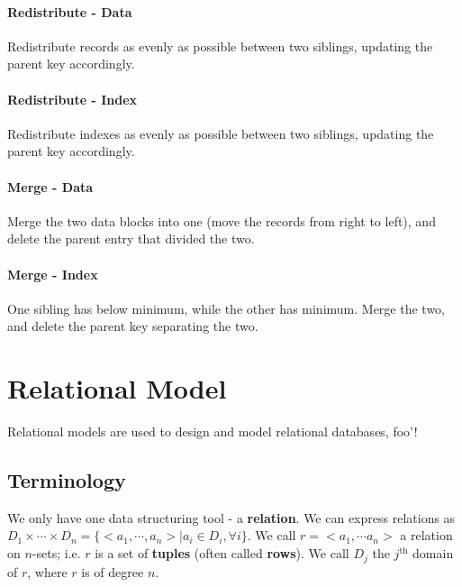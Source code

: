                     \subsubsection{Redistribute - Data} %
                    \label{ssub:redistribute_data}
                        Redistribute records as evenly as possible between two siblings, updating the parent key accordingly.
                    \subsubsection{Redistribute - Index} %
                    \label{ssub:redistribute_index}
                        Redistribute indexes as evenly as possible between two siblings, updating the parent key accordingly.
                    \subsubsection{Merge - Data} %
                    \label{ssub:merge_data}
                        Merge the two data blocks into one (move the records from right to left), and delete the parent entry that divided the two.
                    \subsubsection{Merge - Index} %
                    \label{ssub:merge_index}
                        One sibling has below minimum, while the other has minimum.
                        Merge the two, and delete the parent key separating the two.
        \chapter{Relational Model} %
        \label{cha:relational_model}
            Relational models are used to design and model relational databases, foo'!

            \section{Terminology} %
            \label{sec:terminology}
                We only have one data structuring tool - a \textbf{relation}.
                We can express relations as $D_1 \times \cdots \times D_n = \{ <a_1, \cdots, a_n > | a_i \in D_i, \forall i\}$.
                We call $r = <a_1, \cdots a_n>$ a relation on $n$-sets;
                i.e. $r$ is a set of \textbf{tuples} (often called \textbf{rows}).
                We call $D_j$ the $j^{\text{th}}$ domain of $r$, where $r$ is of degree $n$.

